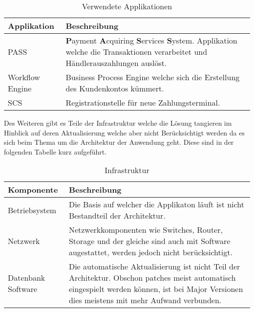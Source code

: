 \begin{table}[H]
	\centering
	\caption{Verwendete Applikationen}
	\begin{tabular}{ | p{3cm} | p{11cm} | }
		\toprule
		{\textbf{Applikation}} & {\textbf{Beschreibung}} \\
		\midrule
		PASS & \textbf{P}ayment \textbf{A}cquiring \textbf{S}ervices \textbf{S}ystem. Applikation welche die Transaktionen verarbeitet und Händlerauszahlungen auslöst. \\ \hline
		Workflow Engine & Business Process Engine welche sich die Erstellung des Kundenkontos kümmert.\\ \hline
		SCS & Registrationstelle für neue Zahlungsterminal.\\
		\bottomrule
	\end{tabular}
\end{table}

Des Weiteren gibt es Teile der Infrastruktur welche die Lösung tangieren im Hinblick auf deren Aktualisierung welche aber nicht Berücksichtigt werden da es sich beim Thema um die Architektur der Anwendung geht. Diese sind in der folgenden Tabelle kurz aufgeführt.

\begin{table}[H]
	\centering
	\caption{Infrastruktur}
	\begin{tabular}{ | p{3cm} | p{11cm} | }
		\toprule
		{\textbf{Komponente}} & {\textbf{Beschreibung}} \\
		\midrule
		Betriebsystem & Die Basis auf welcher die Applikaton läuft ist nicht Bestandteil der Architektur. \\ \hline
		Netzwerk & Netzwerkkomponenten wie Switches, Router, Storage und der gleiche sind auch mit Software augestattet, werden jedoch nicht berücksichtigt.\\ \hline
		Datenbank Software & Die automatische Aktualisierung ist nicht Teil der Architektur. Obschon patches meist automatisch eingespielt werden können, ist bei Major Versionen dies meistens mit mehr Aufwand verbunden. \\
		\bottomrule
	\end{tabular}
\end{table}

